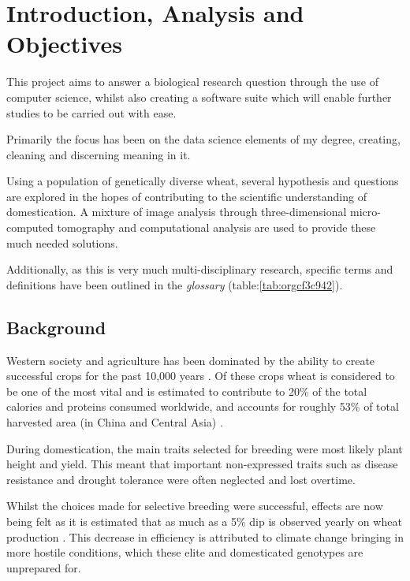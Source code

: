 \documentclass[11pt]{report}
\begin{document}
\chapter{Introduction, Analysis and Objectives}
\label{sec:org3f5163d}

This project aims to answer a biological research question through the use of computer science, whilst also creating a software suite which will enable further studies to be carried out with ease.

Primarily the focus has been on the data science elements of my degree, creating, cleaning and discerning meaning in it.

Using a population of genetically diverse wheat, several hypothesis and questions are explored in the hopes of contributing to the scientific understanding of domestication. A mixture of image analysis through three-dimensional micro-computed tomography and computational analysis are used to provide these much needed solutions.

Additionally, as this is very much multi-disciplinary research, specific terms and definitions have been outlined in the \emph{glossary} (table:\ref{tab:orgcf3c942}).

\section{Background}
\label{sec:orge247ca5}

Western society and agriculture has been dominated by the ability to create successful crops for the past 10,000 years \cite{Ozkan2002}. Of these crops wheat is considered to be one of the most vital and is estimated to contribute to 20\% of the total calories and proteins consumed worldwide, and accounts for roughly 53\% of total harvested area (in China and Central Asia) \cite{Shiferaw2013}.

During domestication, the main traits selected for breeding were most likely plant height and yield. This meant that important non-expressed traits such as disease resistance and drought tolerance were often neglected and lost overtime.

Whilst the choices made for selective breeding were successful, effects are now being felt as it is estimated that as much as a 5\% dip is observed yearly on wheat production \cite{Shiferaw2013}. This decrease in efficiency is attributed to climate change bringing in more hostile conditions, which these elite and  domesticated genotypes are unprepared for.
\end{document}

